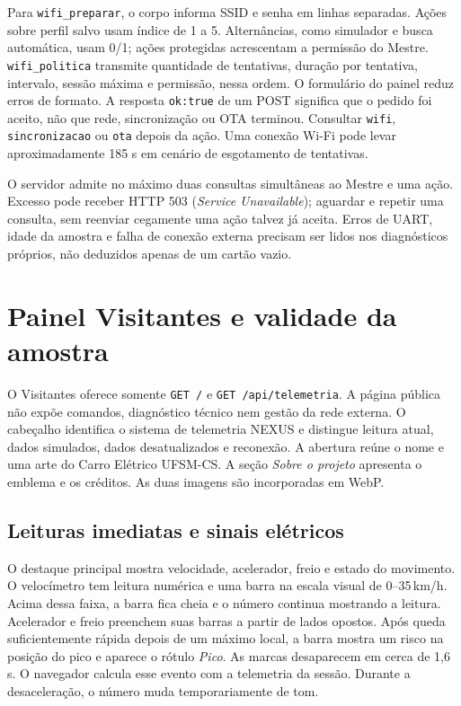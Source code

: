 Para \texttt{wifi\_preparar}, o corpo informa SSID e senha em linhas separadas. Ações sobre perfil salvo usam índice de 1 a 5. Alternâncias, como simulador e busca automática, usam 0/1; ações protegidas acrescentam a permissão do Mestre. \texttt{wifi\_politica} transmite quantidade de tentativas, duração por tentativa, intervalo, sessão máxima e permissão, nessa ordem. O formulário do painel reduz erros de formato. A resposta \texttt{ok:true} de um POST significa que o pedido foi aceito, não que rede, sincronização ou OTA terminou. Consultar \texttt{wifi}, \texttt{sincronizacao} ou \texttt{ota} depois da ação. Uma conexão Wi-Fi pode levar aproximadamente 185 s em cenário de esgotamento de tentativas.

O servidor admite no máximo duas consultas simultâneas ao Mestre e uma ação. Excesso pode receber HTTP 503 (\emph{Service Unavailable}); aguardar e repetir uma consulta, sem reenviar cegamente uma ação talvez já aceita. Erros de UART, idade da amostra e falha de conexão externa precisam ser lidos nos diagnósticos próprios, não deduzidos apenas de um cartão vazio.

\section{Painel Visitantes e validade da amostra}\label{sec:painel-visitantes}
O Visitantes oferece somente \texttt{GET /} e \texttt{GET /api/telemetria}. A página pública não expõe comandos, diagnóstico técnico nem gestão da rede externa. O cabeçalho identifica o sistema de telemetria NEXUS e distingue leitura atual, dados simulados, dados desatualizados e reconexão. A abertura reúne o nome e uma arte do Carro Elétrico UFSM-CS. A seção \emph{Sobre o projeto} apresenta o emblema e os créditos. As duas imagens são incorporadas em WebP.

\subsection{Leituras imediatas e sinais elétricos}
O destaque principal mostra velocidade, acelerador, freio e estado do movimento. O velocímetro tem leitura numérica e uma barra na escala visual de 0--35\,km/h. Acima dessa faixa, a barra fica cheia e o número continua mostrando a leitura. Acelerador e freio preenchem suas barras a partir de lados opostos. Após queda suficientemente rápida depois de um máximo local, a barra mostra um risco na posição do pico e aparece o rótulo \emph{Pico}. As marcas desaparecem em cerca de 1,6\,s. O navegador calcula esse evento com a telemetria da sessão. Durante a desaceleração, o número muda temporariamente de tom.


